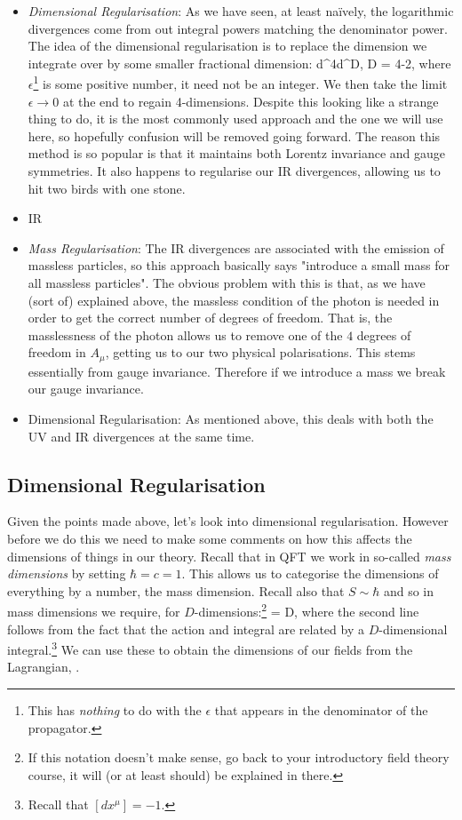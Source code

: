 \begin{itemize}
            \item \textit{Dimensional Regularisation}: As we have seen, at least na\"{i}vely, the logarithmic divergences come from out integral powers matching the denominator power. The idea of the dimensional regularisation is to replace the dimension we integrate over by some smaller fractional dimension:
            \bse 
                \int d^4\ell \to \int d^D\ell, \qquad D = 4-2\epsilon,
            \ese
            where $\epsilon$\footnote{This has \textit{nothing} to do with the $\epsilon$ that appears in the denominator of the propagator.} is some positive number, it need not be an integer. We then take the limit $\epsilon\to0$ at the end to regain 4-dimensions. Despite this looking like a strange thing to do, it is the most commonly used approach and the one we will use here, so hopefully confusion will be removed going forward. The reason this method is so popular is that it maintains both Lorentz invariance and gauge symmetries. It also happens to regularise our IR divergences, allowing us to hit two birds with one stone. 
        \een 
    \item IR
        \ben[label=(\roman*)]
            \item \textit{Mass Regularisation}: The IR divergences are associated with the emission of massless particles, so this approach basically says "introduce a small mass for all massless particles". The obvious problem with this is that, as we have (sort of) explained above, the massless condition of the photon is needed in order to get the correct number of degrees of freedom. That is, the masslessness of the photon allows us to remove one of the $4$ degrees of freedom in $A_{\mu}$, getting us to our two physical polarisations. This stems essentially from gauge invariance. Therefore if we introduce a mass we break our gauge invariance.
            \item Dimensional Regularisation: As mentioned above, this deals with both the UV and IR divergences at the same time. 
        \een 
\end{itemize}

\subsection{Dimensional Regularisation}

Given the points made above, let's look into dimensional regularisation. However before we do this we need to make some comments on how this affects the dimensions of things in our theory. Recall that in QFT we work in so-called \textit{mass dimensions} by setting $\hbar=c=1$. This allows us to categorise the dimensions of everything by a number, the mass dimension. Recall also that $S\sim \hbar$ and so in mass dimensions we require, for $D$-dimensions:\footnote{If this notation doesn't make sense, go back to your introductory field theory course, it will (or at least should) be explained in there.}
 \qquad \iff \qquad [\cL] = D,
\ese
where the second line follows from the fact that the action and integral are related by a $D$-dimensional integral.\footnote{Recall that $[dx^{\mu}]=-1$.} We can use these to obtain the dimensions of our fields from the Lagrangian, .

